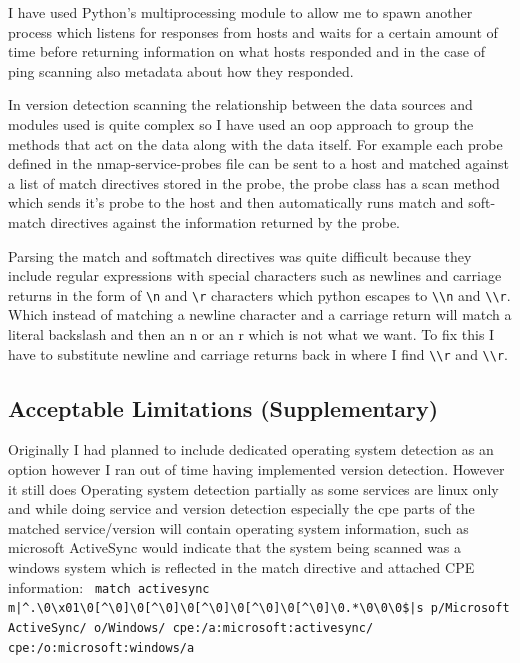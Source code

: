 \documentclass[titlepage]{article}
\let\Oldsubsection\subsection{}
\renewcommand{\subsection}{\FloatBarrier\Oldsubsection}
\begin{document}
I have used Python's multiprocessing module to allow me to spawn another process which listens
for responses from hosts and waits for a certain amount of time before returning information
on what hosts responded and in the case of ping scanning also metadata about how they responded.

In version detection scanning the relationship between the data sources and modules used is quite
complex so I have used an \gls{oop} approach to group the methods
that act on the data along with the data itself. For example each probe defined in the nmap-service-probes
file can be sent to a host and matched against a list of match directives stored in the probe,
the probe class has a scan method which sends it's probe to the host and then automatically runs
match and soft-match directives against the information returned by the probe.

Parsing the match and softmatch directives was quite difficult because they include regular
expressions with special characters such as newlines and carriage returns in the form of
\verb|\n| and \verb|\r| characters which python escapes to \verb|\\n|
and \verb|\\r|. Which instead of matching a newline character and a carriage return
will match a literal backslash and then an n or an r which is not what we want. To fix this I have to substitute
newline and carriage returns back in where I find \verb|\\r| and \verb|\\r|.

\subsection{Acceptable Limitations (Supplementary)}

Originally I had planned to include dedicated operating system detection as an option
however I ran out of time having implemented version detection. However it still does
Operating system detection partially as some services are linux only and while doing
service and version detection especially the \gls{cpe} parts
of the matched service/version will contain operating system information, such as
microsoft ActiveSync would indicate that the system being scanned was a windows system
which is reflected in the match directive and attached CPE information: \texttt{%
match activesync m|{\textasciicircum}.{\textbackslash}0{\textbackslash}x01{\textbackslash}0[{\textasciicircum}{\textbackslash}0]{\textbackslash}0[{\textasciicircum}{\textbackslash}0]{\textbackslash}0[{\textasciicircum}{\textbackslash}0]{\textbackslash}0[{\textasciicircum}{\textbackslash}0]{\textbackslash}0[{\textasciicircum}{\textbackslash}0]{\textbackslash}0.*{\textbackslash}0{\textbackslash}0{\textbackslash}0\$|s p/Microsoft ActiveSync/ o/Windows/ cpe:/a:microsoft:activesync/ cpe:/o:microsoft:windows/a
}
\end{document}
